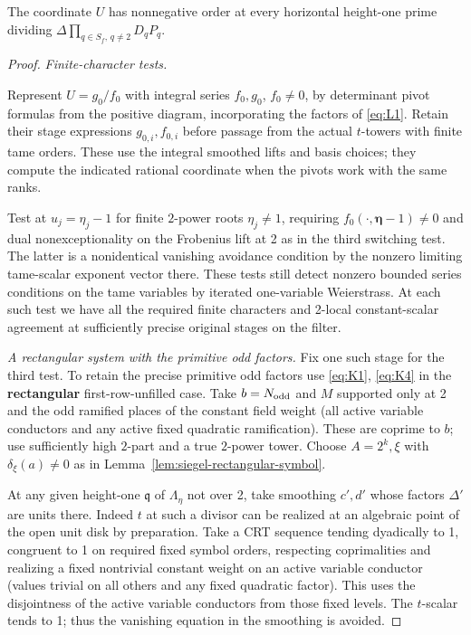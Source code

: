 \begin{lemma}\label{lem:positive-determinant:division}
The coordinate \(U\) has nonnegative order at every horizontal height-one
prime dividing \(\Delta\prod_{q\in S_f,\,q\ne2}D_qP_q\).
\end{lemma}
\begin{proof}
\emph{Finite-character tests.}

Represent \(U=g_0/f_0\) with integral series \(f_0,g_0\), \(f_0\ne0\), by determinant pivot formulas from the positive diagram, incorporating the factors of \eqref{eq:L1}. Retain their stage expressions \(g_{0,i},f_{0,i}\) before passage from the actual \(t\)-towers with finite tame orders. These use the integral smoothed lifts and basis choices; they compute the indicated rational coordinate when the pivots work with the same ranks. 

Test at \(u_j=\eta_j-1\) for finite \(2\)-power roots \(\eta_j\ne1\), requiring \(f_0(\cdot,\boldsymbol\eta-1)\ne0\) and dual nonexceptionality on the Frobenius lift at 2 as in the third switching test. The latter is a nonidentical vanishing avoidance condition by the nonzero limiting tame-scalar exponent vector there. These tests still detect nonzero bounded series conditions on the tame variables by iterated one-variable Weierstrass. At each such test we have all the required finite characters and 2-local constant-scalar agreement at sufficiently precise original stages on the filter.

\emph{A rectangular system with the primitive odd factors.}
Fix one such stage for the third test. To retain the precise primitive odd factors use \eqref{eq:K1}, \eqref{eq:K4} in the \textbf{rectangular} first-row-unfilled case. Take \(b=N_{\rm odd}\) and \(M\) supported only at 2 and the odd ramified places of the constant field weight (all active variable conductors and any active fixed quadratic ramification). These are coprime to \(b\); use sufficiently high \(2\)-part and a true \(2\)-power tower. Choose \(A=2^k,\xi\) with \(\delta_\xi(a)\ne0\) as in Lemma~\ref{lem:siegel-rectangular-symbol}. 

At any given height-one \(\mathfrak q\) of \(\Lambda_\eta\) not over 2, take smoothing \(c',d'\) whose factors \(\Delta'\) are units there. Indeed \(t\) at such a divisor can be realized at an algebraic point of the open unit disk by preparation. Take a CRT sequence tending dyadically to 1, congruent to 1 on required fixed symbol orders, respecting coprimalities and realizing a fixed nontrivial constant weight on an active variable conductor (values trivial on all others and any fixed quadratic factor). This uses the disjointness of the active variable conductors from those fixed levels. The \(t\)-scalar tends to 1; thus the vanishing equation in the smoothing is avoided. 


\end{proof}
